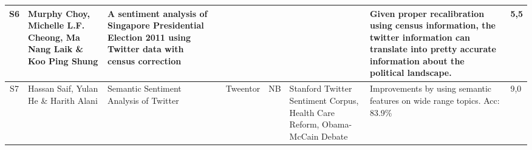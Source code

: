 \begin{sidewaystable}
\begin{longtable}{|c|p{3cm}|p{4cm}|p{0.6cm}|p{1cm}|p{1.3cm}|p{4cm}|p{3cm}|p{0.3cm}|}
    S6 & Murphy Choy, Michelle L.F. Cheong, Ma Nang Laik \& Koo Ping Shung & A sentiment analysis of Singapore Presidential Election 2011 using Twitter data with census correction & \citeyear{choy2011sentiment} &  &  &  & Given proper recalibration using census information, the twitter information can translate into pretty accurate information about the political landscape.  & 5,5 \\ \hline  
    
    S7 & Hassan Saif, Yulan He \& Harith Alani & Semantic Sentiment Analysis of Twitter & \citeyear{saif2012semantic} & Tweentor & NB & Stanford Twitter Sentiment Corpus, Health Care Reform, Obama-McCain Debate & Improvements by using semantic features on wide range topics. Acc: 83.9\%  & 9,0 \\ \hline  
    
    
    \end{longtable}
\end{sidewaystable}

\addtocounter{table}{-1}

